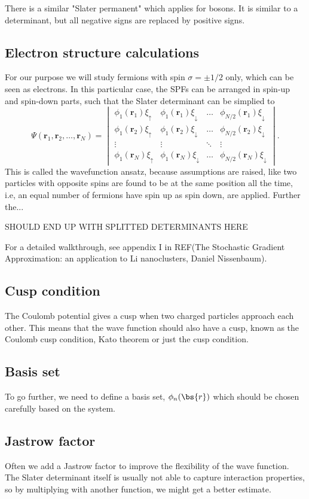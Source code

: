 There is a similar "Slater permanent" which applies for bosons. It is similar to a determinant, but all negative signs are replaced by positive signs. 

\subsection{Electron structure calculations} \label{subsubsec:electronsystem}
For our purpose we will study fermions with spin $\sigma=\pm 1/2$ only, which can be seen as electrons. In this particular case, the SPFs can be arranged in spin-up and spin-down parts, such that the Slater determinant can be simplied to 
\begin{equation}
\Psi(\boldsymbol{r}_1,\boldsymbol{r}_2,\hdots,\boldsymbol{r}_N)=
\begin{vmatrix}
\phi_1(\boldsymbol{r}_1)\xi_{\uparrow} & \phi_1(\boldsymbol{r}_1)\xi_{\downarrow} & \hdots & \phi_{N/2}(\boldsymbol{r}_1)\xi_{\downarrow}\\
\phi_1(\boldsymbol{r}_2)\xi_{\uparrow} & \phi_1(\boldsymbol{r}_2)\xi_{\downarrow} & \hdots & \phi_{N/2}(\boldsymbol{r}_2)\xi_{\downarrow}\\
\vdots & \vdots & \ddots & \vdots \\
\phi_1(\boldsymbol{r}_N)\xi_{\uparrow} & \phi_1(\boldsymbol{r}_N)\xi_{\downarrow} & \hdots & \phi_{N/2}(\boldsymbol{r}_N)\xi_{\downarrow}
\end{vmatrix}.
\end{equation}
This is called the wavefunction ansatz, because assumptions are raised, like two particles with opposite spins are found to be at the same position all the time, i.e, an equal number of fermions have spin up as spin down, are applied. Further the...

SHOULD END UP WITH SPLITTED DETERMINANTS HERE

For a detailed walkthrough, see appendix I in REF(The Stochastic Gradient Approximation: an application to Li nanoclusters, Daniel Nissenbaum). 

\subsection{Cusp condition} \label{subsubsec:cusp}
The Coulomb potential gives a cusp when two charged particles approach each other. This means that the wave function should also have a cusp, known as the Coulomb cusp condition, Kato theorem or just the cusp condition. 

\subsection{Basis set} \label{subsubsec:basisset}
To go further, we need to define a basis set, $\phi_n(\bs{r})$ which should be chosen carefully based on the system. 

\subsection{Jastrow factor} \label{subsubsec:jastrow}
Often we add a Jastrow factor to improve the flexibility of the wave function. The Slater determinant itself is usually not able to capture interaction properties, so by multiplying with another function, we might get a better estimate. 





